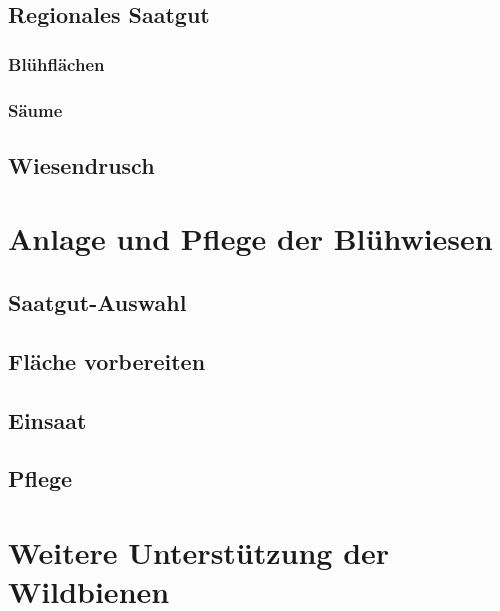 \documentclass[
]{book}
\begin{document}
\hypertarget{regionales-saatgut}{%
\subsection{Regionales Saatgut}\label{regionales-saatgut}}

\hypertarget{bluxfchfluxe4chen}{%
\subsubsection{Blühflächen}\label{bluxfchfluxe4chen}}

\hypertarget{suxe4ume-1}{%
\subsubsection{Säume}\label{suxe4ume-1}}

\hypertarget{wiesendrusch}{%
\subsection{Wiesendrusch}\label{wiesendrusch}}

\hypertarget{anlage-und-pflege-der-bluxfchwiesen}{%
\section{Anlage und Pflege der Blühwiesen}\label{anlage-und-pflege-der-bluxfchwiesen}}

\hypertarget{saatgut-auswahl}{%
\subsection{Saatgut-Auswahl}\label{saatgut-auswahl}}

\hypertarget{fluxe4che-vorbereiten}{%
\subsection{Fläche vorbereiten}\label{fluxe4che-vorbereiten}}

\hypertarget{einsaat}{%
\subsection{Einsaat}\label{einsaat}}

\hypertarget{pflege}{%
\subsection{Pflege}\label{pflege}}

\hypertarget{weitere-unterstuxfctzung-der-wildbienen}{%
\section{Weitere Unterstützung der Wildbienen}\label{weitere-unterstuxfctzung-der-wildbienen}}
\end{document}
